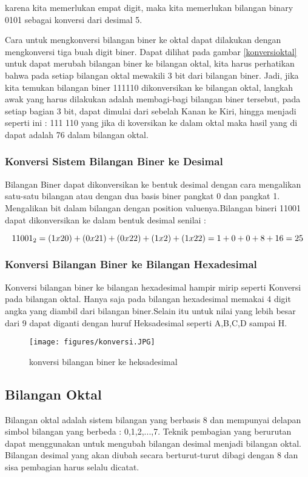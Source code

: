 karena kita memerlukan empat digit, maka kita memerlukan bilangan binary 0101 sebagai konversi dari desimal 5.

Cara untuk mengkonversi bilangan biner ke oktal dapat dilakukan dengan mengkonversi tiga buah digit biner. Dapat dilihat pada gambar \ref{konversioktal} untuk dapat merubah bilangan biner ke bilangan oktal, kita harus perhatikan bahwa pada setiap bilangan oktal mewakili 3 bit dari bilangan biner. Jadi, jika kita temukan bilangan biner 111110 dikonversikan ke bilangan oktal, langkah awak yang harus dilakukan adalah membagi-bagi bilangan biner tersebut, pada setiap bagian 3 bit, dapat dimulai dari sebelah Kanan ke Kiri, hingga menjadi seperti ini : 111 110 yang jika di koversikan ke dalam oktal maka hasil yang di dapat adalah 76 dalam bilangan oktal.

\subsubsection{Konversi Sistem Bilangan Biner ke Desimal}
Bilangan Biner dapat dikonversikan ke bentuk desimal dengan cara mengalikan satu-satu bilangan atau dengan dua basis biner pangkat 0 dan pangkat 1. Mengalikan bit dalam bilangan dengan position valuenya.Bilangan bineri 11001 dapat dikonversikan ke dalam bentuk desimal senilai : \break 

\begin{equation}
11001_{2} = (1x20)+(0x21)+(0x22)+(1x2)+(1x22) \break 
= 1+0+0+8+16 
= 25
\end{equation}

\subsubsection{Konversi Bilangan Biner ke Bilangan Hexadesimal}
Konversi bilangan biner ke bilangan hexadesimal hampir mirip seperti Konversi pada bilangan oktal. Hanya saja pada bilangan hexadesimal memakai 4 digit angka yang diambil dari bilangan biner.Selain itu untuk nilai yang lebih besar dari 9 dapat diganti dengan huruf Heksadesimal seperti A,B,C,D sampai H. 

\begin{figure}[ht]
\centerline{\texttt{[image: figures/konversi.JPG]}}
\caption{konversi bilangan biner ke heksadesimal}
\label{konversi}
\end {figure}

\subsection{Bilangan Oktal}
Bilangan oktal adalah sistem bilangan yang berbasis 8 dan mempunyai delapan simbol bilangan yang berbeda : 0,1,2,...,7.
Teknik pembagian yang berurutan dapat menggunakan untuk mengubah bilangan desimal menjadi bilangan oktal. Bilangan desimal yang akan diubah secara berturut-turut dibagi dengan 8 dan sisa pembagian harus selalu dicatat. 
